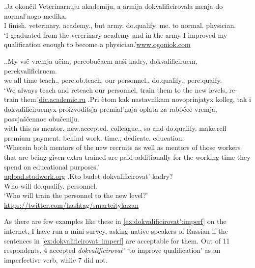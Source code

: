 \exg.\label{ex:dokvalificirovat':perf}Ja okon\v{c}il Veterinarnuju akademiju, a armija dokvalificirovala menja do normal'nogo medika.\\
I finish. veterinary. academy., but army. do.qualify. me. to normal. physician.\\
\trans `I graduated from the vererinary academy and in the army I improved my qualification enough to become a physician.'\hbox{}\hfill\hbox{\url{www.ogoniok.com}}

\ex.\label{ex:dokvalificirovat':imperf}\ag.\label{ex:dokvalificirovat':ongoing}My vs\"{e} vremja u\v{c}im, pereobu\v{c}aem na\v{s}i kadry, dokvalificiruem, perekvalificiruem.\\
we all time teach., pere.ob.teach. our personnel., do.qualify., pere.quaify.\\
\trans `We always teach and reteach our personnel, train them to the new levels, re-train them.'\hbox{}\hfill\hbox{\url{dic.academic.ru}}
\bg.\label{ex:dokvalificirovat':part}Pri \`{e}tom kak nastavnikam novoprinjatyx kolleg, tak i dokvalificiruemyx proizvoditsja premial'naja oplata za rabo\v{c}ee vremja, posvja\v{s}\v{c}ennoe obu\v{c}eniju.\\
with this as mentor. new.accepted. colleague., so and do.qualify. make.refl premium payment. behind work. time., dedicate. education.\\
\trans `Wherein both mentors of the new recruits as well as mentors of those workers that are being given extra-trained are paid additionally for the working time they spend on educational purposes.'\\\hbox{}\hfill\hbox{\url{upload.studwork.org}}
\bg.\label{ex:dokvalificirovat':future}Kto budet dokvalificirovat' kadry?\\
Who will do.qualify. personnel.\\
\trans `Who will train the personnel to the new level?'\\\hbox{}\hfill\hbox{\url{https://twitter.com/hashtag/smartcitykazan}}

As there are few examples like these in \ref{ex:dokvalificirovat':imperf} on the internet, I have run a mini-survey, asking native speakers of Russian if the sentences in \ref{ex:dokvalificirovat':imperf} are acceptable for them. Out of 11 respondents, 4 accepted \textit{dokvalificirovat'} `to improve qualification' as an imperfective verb, while 7 did not.

